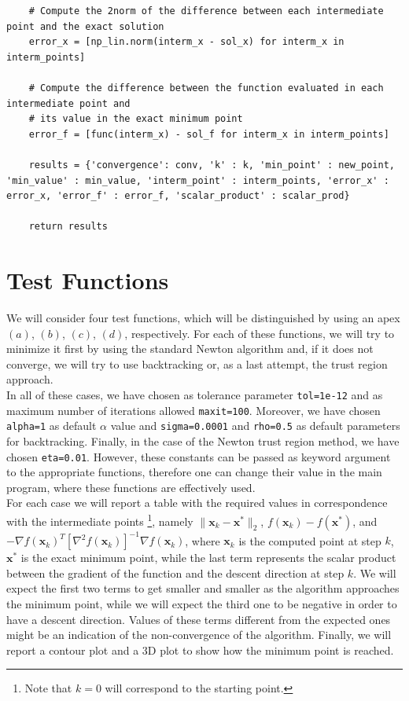 \documentclass[a4paper,11pt]{article}
\begin{document}
\begin{verbatim}
    # Compute the 2norm of the difference between each intermediate point and the exact solution
    error_x = [np_lin.norm(interm_x - sol_x) for interm_x in interm_points]

    # Compute the difference between the function evaluated in each intermediate point and 
    # its value in the exact minimum point
    error_f = [func(interm_x) - sol_f for interm_x in interm_points]

    results = {'convergence': conv, 'k' : k, 'min_point' : new_point, 'min_value' : min_value, 'interm_point' : interm_points, 'error_x' : error_x, 'error_f' : error_f, 'scalar_product' : scalar_prod}

    return results
\end{verbatim}


	\section{Test Functions}
	We will consider four test functions, which will be distinguished by using an apex $(a)$, $(b)$, $(c)$, $(d)$, respectively. For each of these functions, we will try to minimize it first by using the standard Newton algorithm and, if it does not converge, we will try to use backtracking or, as a last attempt, the trust region approach.\\
	
	\noindent In all of these cases, we have chosen as tolerance parameter  \texttt{tol=1e-12} and as maximum number of iterations allowed \texttt{maxit=100}. Moreover, we have chosen \texttt{alpha=1} as default $\alpha$ value and \texttt{sigma=0.0001} and \texttt{rho=0.5} as default parameters for backtracking. Finally, in the case of the Newton trust region method, we have chosen \texttt{eta=0.01}. However, these constants can be passed as keyword argument to the appropriate functions, therefore one can change their value in the main program, where these functions are effectively used.\\
	
	\noindent For each case we will report a table with the required values in correspondence with the intermediate points \footnote{Note that $k=0$ will correspond to the starting point.}, namely $\| \textbf{x}_{k} - \textbf{x}^*\|_{2} $, $f(\textbf{x}_{k}) - f(\textbf{x}^{*}) $, and $-\nabla f(\textbf{x}_{k})^{T} [\nabla^{2}f(\textbf{x}_{k})]^{-1} \nabla f(\textbf{x}_{k})$, where $\textbf{x}_{k}$ is the computed point at step $k$, $\textbf{x}^*$ is the exact minimum point, while the last term represents the scalar product between the gradient of the function and the descent direction at step $k$. We will expect the first two terms to get smaller and smaller as the algorithm approaches the minimum point, while we will expect the third one to be negative in order to have a descent direction. Values of these terms different from the expected ones might be an indication of the non-convergence of the algorithm. Finally, we will report a contour plot and a 3D plot to show how the minimum point is reached.
	
\end{document}
